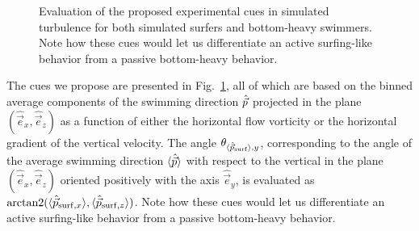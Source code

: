 \begin{figure}
	\centering
	
	\caption[Evaluation of the proposed experimental cues in simulated turbulence.]{
		Evaluation of the proposed experimental cues in simulated turbulence for both simulated surfers and bottom-heavy swimmers.
		Note how these cues would let us differentiate an active surfing-like behavior from a passive bottom-heavy behavior.
	}
	\label{fig:experimental_cues}
\end{figure}
The cues we propose are presented in Fig.~\ref{fig:experimental_cues}, all of which are based on the binned average components of the swimming direction $\hat{\vec{p}}$ projected in the plane $(\hat{\vec{e}}_x, \hat{\vec{e}}_z)$ as a function of either the horizontal flow vorticity or the horizontal gradient of the vertical velocity.
The angle $\theta _{\langle \hat{\vec{p}}_{\mathrm{surf}} \rangle, y}$, corresponding to the angle of the average swimming direction $\langle \hat{\vec{p}} \rangle$ with respect to the vertical in the plane $(\hat{\vec{e}}_x, \hat{\vec{e}}_z)$ oriented positively with the axis $\hat{\vec{e}}_y$, is evaluated as $\arctan2 (\langle \SwimmingDirection_{\mathrm{\NameSurfShort}, x} \rangle, \langle \SwimmingDirection_{\mathrm{\NameSurfShort}, \DirectionScalar} \rangle)$.
Note how these cues would let us differentiate an active surfing-like behavior from a passive bottom-heavy behavior.

% 

